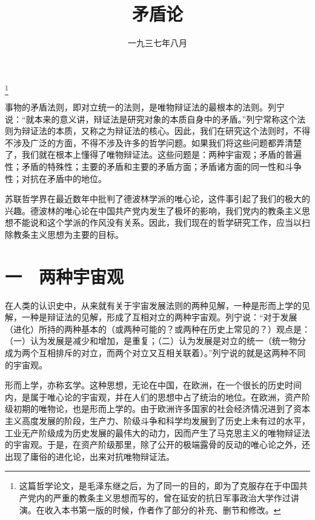 
\title{矛盾论}
\date{一九三七年八月}
\thanks{这篇哲学论文，是毛泽东继之后，为了同一的目的，即为了克服存在于中国共产党内的严重的教条主义思想而写的，曾在延安的抗日军事政治大学作过讲演。在收入本书第一版的时候，作者作了部分的补充、删节和修改。}
\maketitle


事物的矛盾法则，即对立统一的法则，是唯物辩证法的最根本的法则。列宁说：“就本来的意义讲，辩证法是研究对象的本质自身中的矛盾。”列宁常称这个法则为辩证法的本质，又称之为辩证法的核心。因此，我们在研究这个法则时，不得不涉及广泛的方面，不得不涉及许多的哲学问题。如果我们将这些问题都弄清楚了，我们就在根本上懂得了唯物辩证法。这些问题是：两种宇宙观；矛盾的普遍性；矛盾的特殊性；主要的矛盾和主要的矛盾方面；矛盾诸方面的同一性和斗争性；对抗在矛盾中的地位。

苏联哲学界在最近数年中批判了德波林学派的唯心论，这件事引起了我们的极大的兴趣。德波林的唯心论在中国共产党内发生了极坏的影响，我们党内的教条主义思想不能说和这个学派的作风没有关系。因此，我们现在的哲学研究工作，应当以扫除教条主义思想为主要的目标。

\section{一　两种宇宙观}

在人类的认识史中，从来就有关于宇宙发展法则的两种见解，一种是形而上学的见解，一种是辩证法的见解，形成了互相对立的两种宇宙观。列宁说：“对于发展（进化）所持的两种基本的（或两种可能的？或两种在历史上常见的？）观点是：（一）认为发展是减少和增加，是重复；（二）认为发展是对立的统一（统一物分成为两个互相排斥的对立，而两个对立又互相关联着）。”列宁说的就是这两种不同的宇宙观。

形而上学，亦称玄学。这种思想，无论在中国，在欧洲，在一个很长的历史时间内，是属于唯心论的宇宙观，并在人们的思想中占了统治的地位。在欧洲，资产阶级初期的唯物论，也是形而上学的。由于欧洲许多国家的社会经济情况进到了资本主义高度发展的阶段，生产力、阶级斗争和科学均发展到了历史上未有过的水平，工业无产阶级成为历史发展的最伟大的动力，因而产生了马克思主义的唯物辩证法的宇宙观。于是，在资产阶级那里，除了公开的极端露骨的反动的唯心论之外，还出现了庸俗的进化论，出来对抗唯物辩证法。

